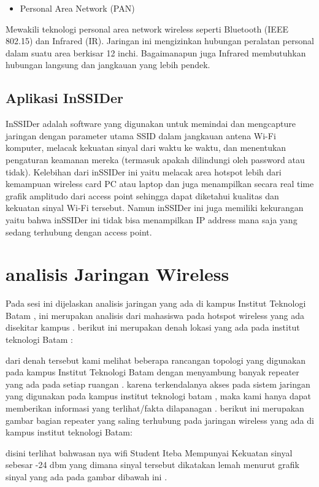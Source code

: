 \documentclass[conference]{IEEEtran}
\begin{document}
\begin{itemize}
    \item Personal Area Network (PAN)
\end{itemize}
Mewakili teknologi personal area network wireless seperti Bluetooth (IEEE 802.15) dan Infrared (IR). 
Jaringan ini mengizinkan hubungan peralatan personal dalam suatu area berkisar 12 inchi. 
Bagaimanapun juga Infrared membutuhkan hubungan langsung dan jangkauan yang lebih pendek.~\cite{yudianto2014jaringan}

\subsection{Aplikasi InSSIDer}

InSSIDer adalah software yang digunakan untuk memindai dan mengcapture jaringan dengan parameter utama SSID dalam jangkauan antena Wi-Fi komputer, melacak kekuatan sinyal dari waktu ke waktu, dan menentukan pengaturan keamanan mereka (termasuk apakah dilindungi oleh password atau tidak).
Kelebihan dari inSSIDer ini yaitu melacak area hotspot lebih dari kemampuan wireless card PC atau laptop dan juga menampilkan secara real time grafik amplitudo dari access point sehingga dapat diketahui kualitas dan kekuatan sinyal Wi-Fi tersebut. Namun inSSIDer ini juga memiliki kekurangan yaitu bahwa inSSIDer ini tidak bisa menampilkan IP address mana saja yang sedang terhubung dengan access point.


\section{analisis Jaringan Wireless}
Pada sesi ini dijelaskan analisis jaringan yang ada di kampus Institut Teknologi Batam , ini merupakan analisis dari mahasiswa
pada hotspot wireless yang ada disekitar kampus . berikut ini merupakan denah lokasi yang ada pada institut teknologi Batam :



dari denah tersebut kami melihat beberapa rancangan topologi yang digunakan pada kampus Institut Teknologi Batam dengan menyambung banyak repeater yang 
ada pada setiap ruangan . karena terkendalanya akses pada sistem jaringan yang digunakan pada kampus institut teknologi batam , maka kami hanya dapat memberikan 
informasi yang terlihat/fakta dilapanagan . berikut ini merupakan gambar bagian repeater yang saling terhubung pada jaringan wireless yang ada di kampus institut teknologi Batam:


disini terlihat bahwasan nya wifi Student Iteba Mempunyai Kekuatan sinyal sebesar -24 dbm yang dimana sinyal tersebut dikatakan lemah menurut
grafik sinyal yang ada pada gambar dibawah ini .
\end{document}
